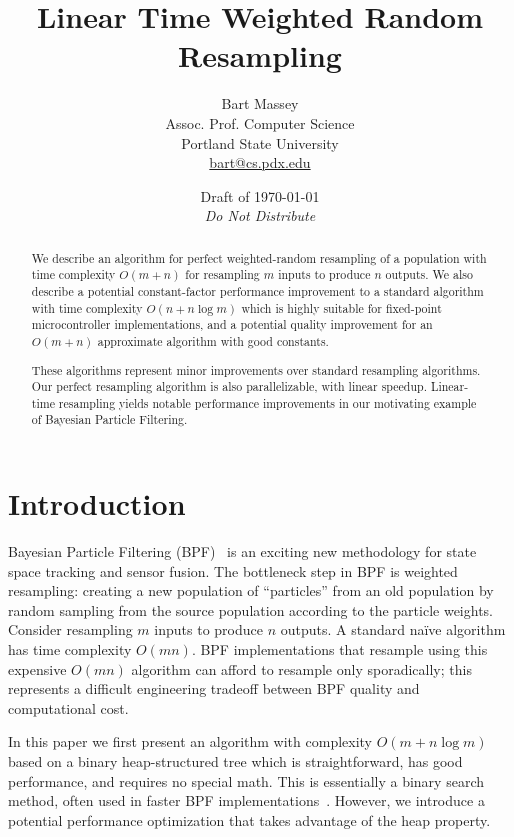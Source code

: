 \documentclass[12pt]{article}
\title{Linear Time Weighted Random Resampling}
\author{Bart Massey\\
  Assoc. Prof. Computer Science\\
  Portland State University\\
  \url{bart@cs.pdx.edu}}
\date{Draft of \today\\{\em Do Not Distribute}}
\begin{document}
  \maketitle

  \begin{abstract}
  We describe an algorithm for perfect weighted-random
  resampling of a population with time complexity $O(m +
  n)$ for resampling $m$ inputs to produce $n$ outputs.
  We also describe a potential constant-factor performance improvement to a
  standard algorithm with time complexity
  $O(n + n \log m)$ which is highly suitable for fixed-point
  microcontroller implementations, and a potential quality
  improvement for an $O(m+n)$ approximate algorithm with
  good constants.

  These algorithms represent minor improvements over
  standard resampling algorithms.  Our perfect resampling
  algorithm is also parallelizable, with linear speedup.
  Linear-time resampling yields notable performance
  improvements in our motivating example of Bayesian
  Particle Filtering.
  \end{abstract}

\section{Introduction}

  Bayesian Particle Filtering (BPF)~\cite{bpf} is an exciting
  new methodology for state space tracking and sensor fusion.
  The bottleneck step in BPF is weighted resampling: creating
  a new population of ``particles'' from an old population by
  random sampling from the source population according to the
  particle weights.  Consider resampling $m$ inputs to produce
  $n$ outputs.  A standard na\"ive algorithm has time
  complexity $O(mn)$.  BPF implementations that resample using
  this expensive $O(mn)$ algorithm can afford to resample only
  sporadically; this represents a difficult engineering
  tradeoff between BPF quality and computational cost.

  In this paper we first present an algorithm with
  complexity $O(m + n \log m)$ based on a binary
  heap-structured tree which is straightforward, has good
  performance, and requires no special math.  This is
  essentially a binary search method, often used in faster
  BPF implementations~\cite{arulampalam02tutorial}.  However, we introduce a potential
  performance optimization that takes advantage of the heap
  property.
\end{document}
